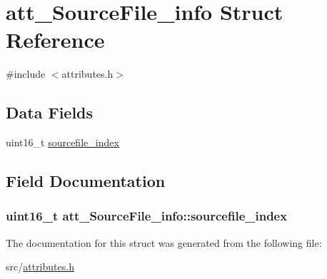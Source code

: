 \hypertarget{structatt__SourceFile__info}{}\section{att\+\_\+\+Source\+File\+\_\+info Struct Reference}
\label{structatt__SourceFile__info}


{\ttfamily \#include $<$attributes.\+h$>$}

\subsection*{Data Fields}
\begin{DoxyCompactItemize}
\item 
uint16\+\_\+t \hyperlink{structatt__SourceFile__info_a8cd88fda3147c1e7b1270dcc39754f1c}{sourcefile\+\_\+index}
\end{DoxyCompactItemize}


\subsection{Field Documentation}
\subsubsection[{\texorpdfstring{sourcefile\+\_\+index}{sourcefile_index}}]{\setlength{\rightskip}{0pt plus 5cm}uint16\+\_\+t att\+\_\+\+Source\+File\+\_\+info\+::sourcefile\+\_\+index}\hypertarget{structatt__SourceFile__info_a8cd88fda3147c1e7b1270dcc39754f1c}{}\label{structatt__SourceFile__info_a8cd88fda3147c1e7b1270dcc39754f1c}


The documentation for this struct was generated from the following file\+:\begin{DoxyCompactItemize}
\item 
src/\hyperlink{attributes_8h}{attributes.\+h}\end{DoxyCompactItemize}
